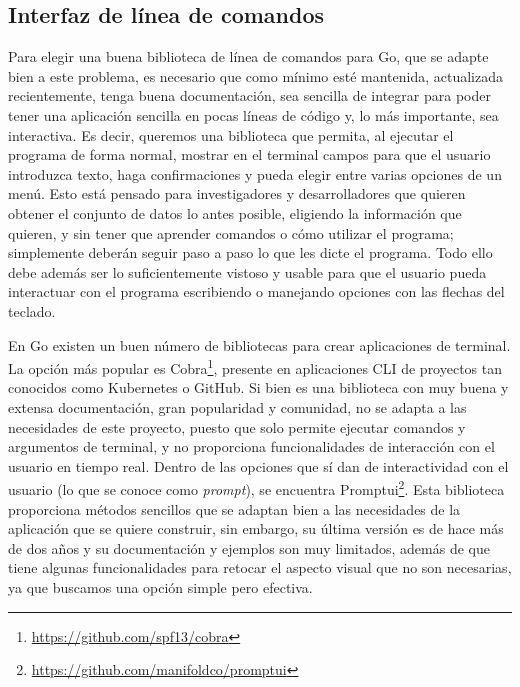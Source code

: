 \subsection{Interfaz de línea de comandos}
Para elegir una buena biblioteca de línea de comandos para Go, que se adapte
bien a este problema, es necesario que como mínimo esté mantenida, actualizada
recientemente, tenga buena documentación, sea sencilla de integrar para poder
tener una aplicación sencilla en pocas líneas de código y, lo más importante,
sea interactiva. Es decir, queremos una biblioteca que permita, al ejecutar el
programa de forma normal, mostrar en el terminal campos para que el usuario
introduzca texto, haga confirmaciones y pueda elegir entre varias opciones de un
menú. Esto está pensado para investigadores y desarrolladores que quieren
obtener el conjunto de datos lo antes posible, eligiendo la información que
quieren, y sin tener que aprender comandos o cómo utilizar el programa;
simplemente deberán seguir paso a paso lo que les dicte el programa. Todo ello
debe además ser lo suficientemente vistoso y usable para que el usuario
pueda interactuar con el programa escribiendo o manejando opciones con las
flechas del teclado.

En Go existen un buen número de bibliotecas para crear aplicaciones de terminal.
La opción más popular es Cobra\footnote{\url{https://github.com/spf13/cobra}},
presente en aplicaciones CLI de proyectos tan conocidos como
Kubernetes o GitHub. Si bien es una biblioteca con muy buena y extensa
documentación, gran popularidad y comunidad, no se adapta a las necesidades de
este proyecto, puesto que solo permite ejecutar comandos y argumentos de
terminal, y no proporciona funcionalidades de interacción con el usuario en
tiempo real. Dentro de las opciones que sí dan de interactividad con el usuario
(lo que se conoce como \textit{prompt}), se encuentra
Promptui\footnote{\url{https://github.com/manifoldco/promptui}}. Esta biblioteca
proporciona métodos sencillos que se adaptan bien a las necesidades de la
aplicación que se quiere construir, sin embargo, su última versión es de hace
más de dos años y su documentación y ejemplos son muy limitados, además de que
tiene algunas funcionalidades para retocar el aspecto visual que no son
necesarias, ya que buscamos una opción simple pero efectiva.

